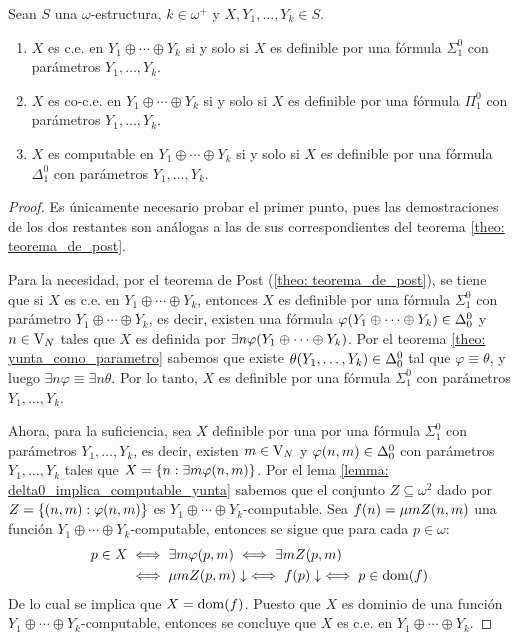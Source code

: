 \begin{theorem}
	\label{theo: teorema_de_post_generalizado}
	Sean $S$ una $\omega$-estructura, $k\in\omega^{+}$ y $X, Y_{1},\dotsc, Y_{k}\in S$.

	\begin{enumerate}
		\item $X$ es c.e. en $Y_{1}\oplus\dotsb\oplus Y_{k}$ si y solo si $X$ es definible por una fórmula $\Sigma_{1}^{0}$ con parámetros $Y_{1},\dotsc, Y_{k}$.
		\item $X$ es co-c.e. en $Y_{1}\oplus\dotsb\oplus Y_{k}$ si y solo si $X$ es definible por una fórmula $\Pi_{1}^{0}$ con parámetros $Y_{1},\dotsc, Y_{k}$.
		\item $X$ es computable en $Y_{1}\oplus\dotsb\oplus Y_{k}$ si y solo si $X$ es definible por una fórmula $\Delta_{1}^{0}$ con parámetros $Y_{1},\dotsc, Y_{k}$.
	\end{enumerate}
\end{theorem}

\begin{proof}
	Es únicamente necesario probar el primer punto, pues las demostraciones de los dos restantes son análogas a las de sus correspondientes del teorema \ref{theo: teorema_de_post}.

	Para la necesidad, por el teorema de Post (\ref{theo: teorema_de_post}), se tiene que si $X$ es c.e. en $Y_{1}\oplus\dotsb\oplus Y_{k}$, entonces $X$ es definible por una fórmula $\Sigma_{1}^{0}$ con parámetro $Y_{1}\oplus\dotsb\oplus Y_{k}$, es decir, existen una fórmula $\varphi\pa*{Y_{1}\oplus\dotsb\oplus Y_{k}}\in\Delta_{0}^{0}$ y $n\in\VARIABLES[N]$ tales que $X$ es definida por $\exists n\varphi\pa*{Y_{1}\oplus\dotsb\oplus Y_{k}}$. Por el teorema \ref{theo: yunta_como_parametro} sabemos que existe $\theta\pa*{Y_{1},\dotsc, Y_{k}}\in\Delta_{0}^{0}$ tal que $\varphi\equiv\theta$, y luego $\exists n\varphi\equiv\exists n\theta$. Por lo tanto, $X$ es definible por una fórmula $\Sigma_{1}^{0}$ con parámetros $Y_{1},\dotsc,Y_{k}$.

	Ahora, para la suficiencia, sea $X$ definible por una por una fórmula $\Sigma_{1}^{0}$ con parámetros $Y_{1},\dotsc, Y_{k}$, es decir, existen $m\in\VARIABLES[N]$ y $\varphi\pa*{n, m}\in\Delta_{0}^{0}$ con parámetros $Y_{1},\dotsc, Y_{k}$ tales que $X =\set*{n:\exists m\varphi\pa*{n, m}}$. Por el lema \ref{lemma: delta0_implica_computable_yunta} sabemos que el conjunto $Z\subseteq\omega^{2}$ dado por $Z =\set*{\pa*{n, m}:\varphi\pa*{n, m}}$ es $Y_{1}\oplus\dotsb\oplus Y_{k}$-computable. Sea $f\pa*{n} =\mu m Z\pa*{n, m}$ una función $Y_{1}\oplus\dotsb\oplus Y_{k}$-computable, entonces se sigue que para cada $p\in\omega$:
	\begin{align*}
		p\in X&\iff\exists m\varphi\pa*{p, m}\iff\exists m Z\pa*{p, m}\\
		&\iff\mu m Z\pa*{p, m}\ACABA\iff f\pa*{p}\ACABA\iff p\in\DOMINIO{f}
	\end{align*}
	De lo cual se implica que $X =\DOMINIO{f}$. Puesto que $X$ es dominio de una función $Y_{1}\oplus\dotsb\oplus Y_{k}$-computable, entonces se concluye que $X$ es c.e. en $Y_{1}\oplus\dotsb\oplus Y_{k}$.
\end{proof}

